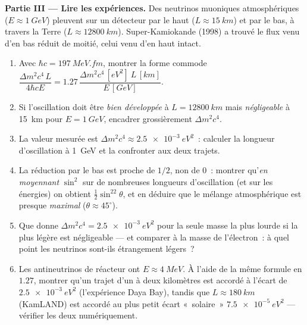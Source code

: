 \begin{problem}
\medskip\noindent\textbf{Partie III --- Lire les expériences.}
Des neutrinos muoniques atmosphériques ($E \approx \qty{1}{GeV}$)
pleuvent sur un détecteur par le haut ($L \approx \qty{15}{km}$) et par
le bas, à travers la Terre ($L \approx \qty{12800}{km}$).
Super-Kamiokande (1998) a trouvé le flux venu d'en bas réduit de
moitié, celui venu d'en haut intact.
\begin{enumerate}[resume]
  \item Avec $\hbar c = \qty{197}{MeV.fm}$, montrer la forme commode
        $\dfrac{\Delta m^2c^4\,L}{4\hbar cE} = 1.27\,
        \dfrac{\Delta m^2c^4\,[\unit{eV^2}]\ L\,[\unit{km}]}
        {E\,[\unit{GeV}]}$.
  \item Si l'oscillation doit être \emph{bien développée} à $L =
        \qty{12800}{km}$ mais \emph{négligeable} à \qty{15}{km} pour
        $E = \qty{1}{GeV}$, encadrer grossièrement $\Delta m^2c^4$.
  \item La valeur mesurée est $\Delta m^2c^4 \approx
        \qty{2.5e-3}{eV^2}$~: calculer la longueur d'oscillation à
        \qty{1}{GeV} et la confronter aux deux trajets.
  \item La réduction par le bas est proche de $1/2$, non de $0$~:
        montrer qu'\emph{en moyennant} $\sin^2$ sur de nombreuses
        longueurs d'oscillation (et sur les énergies) on obtient
        $\tfrac12\sin^22\theta$, et en déduire que le mélange
        atmosphérique est presque \emph{maximal}
        ($\theta \approx 45^\circ$).
  \item Que donne $\Delta m^2c^4 = \qty{2.5e-3}{eV^2}$ pour la seule
        masse la plus lourde si la plus légère est négligeable ---
        et comparer à la masse de l'électron~: à quel point les
        neutrinos sont-ils étrangement légers~?
  \item Les antineutrinos de réacteur ont $E \approx \qty{4}{MeV}$.
        À l'aide de la même formule en $1.27$, montrer qu'un trajet
        d'un à deux kilomètres est accordé à l'écart de
        $\qty{2.5e-3}{eV^2}$ (l'expérience Daya Bay), tandis que
        $L \approx \qty{180}{km}$ (KamLAND) est accordé au plus petit
        écart «~solaire~» $\qty{7.5e-5}{eV^2}$ --- vérifier les deux
        numériquement.
\end{enumerate}


\end{problem}
